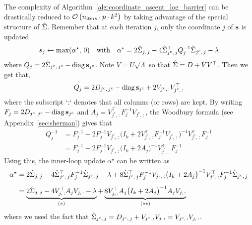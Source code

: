 The complexity of Algorithm~\ref{alg:coordinate_ascent_log_barrier} can be drastically reduced
to $\mathcal{O}\left( n_\text{iters} \cdot p \cdot k^2 \right)$
by taking advantage of the special structure of $\hat{\Sigma}$.
Remember that at each iteration $j$,
only the coordinate $j$ of $\mathbf{s}$ is updated
\begin{equation*}
    s_j \leftarrow \max(\alpha^\star,\, 0)
    \quad\text{with}\quad
    \alpha^\star = 2\hat{\Sigma}_{j,\, j} - 4\hat{\Sigma}_{j^c,\, j}^\top Q_j^{-1} \hat{\Sigma}_{j^c,\, j} - \lambda
\end{equation*}
where $Q_j = 2\hat{\Sigma}_{j^c,\, j^c} - \operatorname*{diag}\mathbf{s}_{j^c}$.
Note $V = U \sqrt{\Lambda}$ so that $\hat{\Sigma} = D + VV^\top$.
Then we get that,
\begin{equation*}
    Q_j = 2D_{j^c,\, j^c} - \operatorname*{diag}\mathbf{s}_{j^c} + 2V_{j^c,\, :}V_{j^c,\, :}^\top
\end{equation*}
where the subscript `:` denotes that all columns (or rows) are kept.
By writing $F_j = 2D_{j^c,\, j^c} - \operatorname*{diag}\mathbf{s}_{j^c}$ and $A_j = V_{j^c,\, :}^\top F_j^{-1} V_{j^c,\, :}$,
the Woodbury formula (see Appendix~\ref{sec:sherman}) gives that
\begin{align*}
    Q_j^{-1} &=
        F_j^{-1} - 2F_j^{-1}V_{j^c,\, :}
            \big( I_k + 2V_{j^c,\, :}^\top F_j^{-1} V_{j^c,\, :} \big)^{-1}
                V_{j^c,\, :}^\top F_j^{-1}\\
    &= F_j^{-1} - 2F_j^{-1}V_{j^c,\, :}
        \big( I_k + 2A_j \big)^{-1}
            V_{j^c,\, :}^\top F_j^{-1}
\end{align*}
Using this, the inner-loop update $\alpha^\star$ can be written as
\begin{align}\label{eq:low_rank_alpha}
    \alpha^\star &=
        2\hat{\Sigma}_{j,\, j}
        - 4\hat{\Sigma}_{j^c,\, j}^\top F_j^{-1} \hat{\Sigma}_{j^c,\, j}
        - \lambda
        + 8\hat{\Sigma}_{j^c,\, j}^\top F_j^{-1} V_{j^c,\, :}
        \big( I_k + 2A_j \big)^{-1}
        V_{j^c,\, :}^\top F_j^{-1}\hat{\Sigma}_{j^c,\, j}\nonumber\\[5pt]
    &= \underbrace{
        2\hat{\Sigma}_{j,\, j}
        - 4V_{j,\, :}^\top A_j V_{j,\, :}
        - \lambda
    }_\text{$(*)$}
    + \underbrace{8V_{j,\, :}^\top A_j
        \big( I_k + 2A_j \big)^{-1}
        A_j V_{j,\, :}
    }_\text{$(**)$}
\end{align}
where we used the fact that
$\hat{\Sigma}_{j^c,\, j} = D_{j^c,\, j} + V_{j^c,\, :}V_{j,\, :} = V_{j^c,\, :}V_{j,\, :}$.

